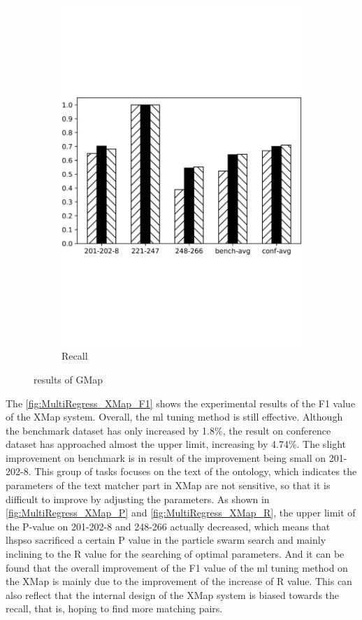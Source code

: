 \documentclass[twoside]{article}
\begin{document}
\begin{figure}[htb!]
\begin{subfigure}{0.3\textwidth}
\includegraphics[width=\textwidth]{data_figs/MulRegress_GMap_R.pdf}
\caption{Recall}
\label{fig:MultiRegress_GMap_R}
\end{subfigure}
\caption{results of GMap}
\end{figure}

The \ref{fig:MultiRegress_XMap_F1} shows the experimental results of the F1 value of the XMap system.
Overall, the ml tuning method is still effective. Although the benchmark dataset has only increased by 1.8\%, the result on conference dataset has approached almost the upper limit, increasing by 4.74\%.
The slight improvement on benchmark is in result of the improvement being small on 201-202-8. This group of tasks focuses on the text of the ontology, which indicates the parameters of the text matcher part in XMap are not sensitive, so that it is difficult to improve by adjusting the parameters.
As shown in \ref{fig:MultiRegress_XMap_P} and \ref{fig:MultiRegress_XMap_R}, the upper limit of the P-value on 201-202-8 and 248-266 actually decreased, which means that lhspso sacrificed a certain P value in the particle swarm search and mainly inclining to the R value for the searching of optimal parameters.
And it can be found that the overall improvement of the F1 value of the ml tuning method on the XMap is mainly due to the improvement of the increase of R value. This can also reflect that the internal design of the XMap system is biased towards the recall, that is, hoping to find more matching pairs.
\end{document}
